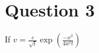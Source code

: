 \documentclass[oneside,11pt,pdftex]{book}%
\numberwithin{section}{chapter}
\numberwithin{equation}{chapter}
\begin{document}
\section{Question 3}
If $ v=\frac{c}{\sqrt{t}} \exp \left(\frac{-x^2}{4a^2t}\right)$

\thispagestyle{empty}%
{\ }
\newpage
\end{document}
